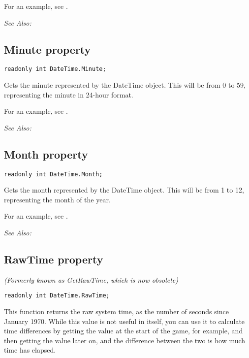 For an example, see .

\it{See Also:} 


\subsection{Minute property}\label{DateTime.Minute}%

\begin{verbatim}
readonly int DateTime.Minute;
\end{verbatim}
Gets the minute represented by the DateTime object. This will be from 0 to 59,
representing the minute in 24-hour format.

For an example, see .

\it{See Also:} 


\subsection{Month property}\label{DateTime.Month}%

\begin{verbatim}
readonly int DateTime.Month;
\end{verbatim}
Gets the month represented by the DateTime object. This will be from 1 to 12,
representing the month of the year.

For an example, see .

\it{See Also:} 


\subsection{RawTime property}\label{DateTime.RawTime}%

\it{(Formerly known as GetRawTime, which is now obsolete)}

\begin{verbatim}
readonly int DateTime.RawTime;
\end{verbatim}
This function returns the raw system time, as the number of seconds since January 1970.
While this value is not useful in itself, you can use it to calculate time differences
by getting the value at the start of the game, for example, and then getting the value
later on, and the difference between the two is how much time has elapsed.

